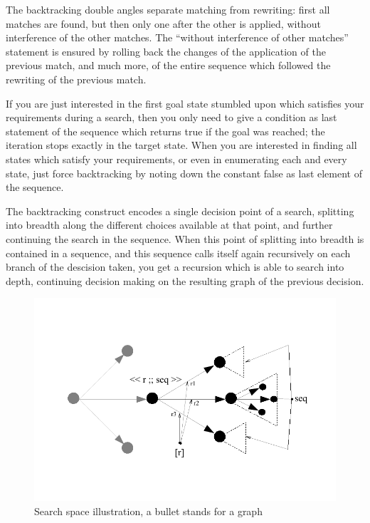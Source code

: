 The backtracking double angles separate matching from rewriting: first all matches are found, but then only one after the other is applied, without interference of the other matches.
The ``without interference of other matches'' statement is ensured by rolling back the changes of the application of the previous match, and much more, of the entire sequence which followed the rewriting of the previous match.

If you are just interested in the first goal state stumbled upon which satisfies your requirements during a search,
then you only need to give a condition as last statement of the sequence which returns true if the goal was reached; the iteration stops exactly in the target state.
When you are interested in finding all states which satisfy your requirements, or even in enumerating each and every state, just force backtracking by noting down the constant false as last element of the sequence.

The backtracking construct encodes a single decision point of a search, splitting into breadth along the different choices available at that point, and further continuing the search in the sequence.
When this point of splitting into breadth is contained in a sequence,
and this sequence calls itself again recursively on each branch of the descision taken,
you get a recursion which is able to search into depth,
continuing decision making on the resulting graph of the previous decision. 

\begin{figure}[htbp]
  \centering
  \includegraphics[width=\textwidth]{fig/SearchSpace}
  \caption{Search space illustration, a bullet stands for a graph}
  \label{figsearchspace}
\end{figure}


